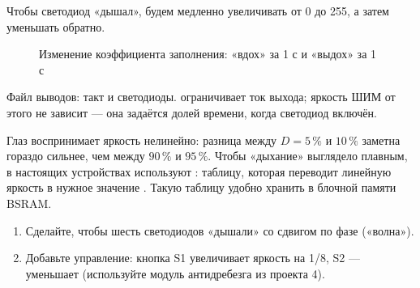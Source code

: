 Чтобы светодиод «дышал», будем медленно увеличивать  от 0 до 255,
а затем уменьшать обратно.

\begin{figure}[H]
\centering
{}
\caption{Изменение коэффициента заполнения: «вдох» за 1 с и «выдох» за 1 с}
\end{figure}


Файл выводов: такт и светодиоды.  ограничивает ток выхода;
яркость ШИМ от этого не зависит --- она задаётся долей времени, когда
светодиод включён.


\begin{infobox}
Глаз воспринимает яркость нелинейно: разница между $D=5\,\%$ и $10\,\%$ заметна
гораздо сильнее, чем между $90\,\%$ и $95\,\%$. Чтобы «дыхание» выглядело
плавным, в настоящих устройствах используют : таблицу,
которая переводит линейную яркость в нужное значение . Такую таблицу
удобно хранить в блочной памяти BSRAM.
\end{infobox}

\begin{taskbox}
\begin{enumerate}
  \item Сделайте, чтобы шесть светодиодов «дышали» со сдвигом по фазе
        («волна»).
  \item Добавьте управление: кнопка S1 увеличивает яркость на 1/8, S2 ---
        уменьшает (используйте модуль антидребезга из проекта 4).
\end{enumerate}
\end{taskbox}

